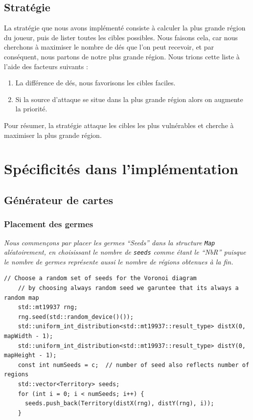 \documentclass[french,nochapter,11pt]{RapportProjet}
\begin{document}
\subsection{Stratégie}
\label{sec:strat}
La stratégie que nous avons implémenté consiste à calculer la plus grande région du joueur, 
puis de lister toutes les cibles possibles. 
Nous faisons cela, car nous cherchons à maximiser le nombre de dés que l'on peut recevoir, 
et par conséquent, nous partons de notre plus grande région.
Nous trions cette liste à l'aide des facteurs suivants : 
\begin{enumerate}
    \item La différence de dés, nous favorisons les cibles faciles.
    \item Si la source d'attaque se situe dans la plus grande région alors on augmente la priorité.
\end{enumerate}

Pour résumer, la stratégie attaque les cibles les plus vulnérables et cherche à maximiser la plus grande région.\newline


\section{Spécificités dans l'implémentation}
\subsection{Générateur de cartes}
\subsubsection{Placement des germes}
\textit{Nous commençons par placer les germes \enquote{Seeds} dans la structure \texttt{Map} 
aléatoirement, en choisissant le nombre de \texttt{seeds} comme étant le \enquote{NbR}
puisque le nombre de germes représente aussi le nombre de régions obtenues à la fin.
}
\begin{lstlisting}[style=CPPStyle]
    // Choose a random set of seeds for the Voronoi diagram
    // by choosing always random seed we garuntee that its always a random map
    std::mt19937 rng;
    rng.seed(std::random_device()());
    std::uniform_int_distribution<std::mt19937::result_type> distX(0, mapWidth - 1);
    std::uniform_int_distribution<std::mt19937::result_type> distY(0, mapHeight - 1);
    const int numSeeds = c;  // number of seed also reflects number of regions
    std::vector<Territory> seeds;
    for (int i = 0; i < numSeeds; i++) {
      seeds.push_back(Territory(distX(rng), distY(rng), i));
    }
\end{lstlisting}
    
\end{document}

